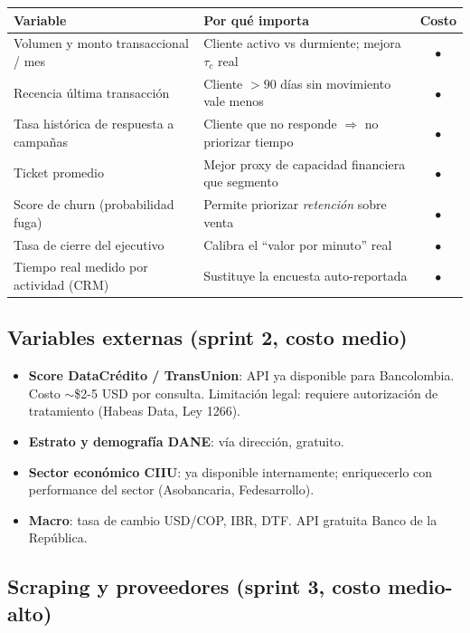 \documentclass[11pt,a4paper]{article}
\newcommand{\rowamarillo}{\rowcolor{bcoamarilloclaro!30}}
\begin{document}
\begin{center}
\renewcommand{\arraystretch}{1.15}
\begin{tabular}{l p{6.5cm} c}
\toprule
\rowcolor{bconegro}\textbf{\color{bcoamarillo}Variable} & \textbf{\color{bcoamarillo}Por qué importa} & \textbf{\color{bcoamarillo}Costo} \\
\midrule
\rowamarillo Volumen y monto transaccional / mes & Cliente activo vs durmiente; mejora $\tau_c$ real & $\bullet$ \\
Recencia última transacción & Cliente $>90$ días sin movimiento vale menos & $\bullet$ \\
\rowamarillo Tasa histórica de respuesta a campañas & Cliente que no responde $\Rightarrow$ no priorizar tiempo & $\bullet$ \\
Ticket promedio & Mejor proxy de capacidad financiera que segmento & $\bullet$ \\
\rowamarillo Score de churn (probabilidad fuga) & Permite priorizar \emph{retención} sobre venta & $\bullet$ \\
Tasa de cierre del ejecutivo & Calibra el ``valor por minuto'' real & $\bullet$ \\
\rowamarillo Tiempo real medido por actividad (CRM) & Sustituye la encuesta auto-reportada & $\bullet$ \\
\bottomrule
\end{tabular}
\end{center}

\subsection{Variables externas (sprint 2, costo medio)}

\begin{itemize}
    \item \textbf{Score DataCrédito / TransUnion}: API ya disponible para Bancolombia. Costo $\sim$\$2-5 USD por consulta. Limitación legal: requiere autorización de tratamiento (Habeas Data, Ley 1266).
    \item \textbf{Estrato y demografía DANE}: vía dirección, gratuito.
    \item \textbf{Sector económico CIIU}: ya disponible internamente; enriquecerlo con performance del sector (Asobancaria, Fedesarrollo).
    \item \textbf{Macro}: tasa de cambio USD/COP, IBR, DTF. API gratuita Banco de la República.
\end{itemize}

\subsection{Scraping y proveedores (sprint 3, costo medio-alto)}
\end{document}
